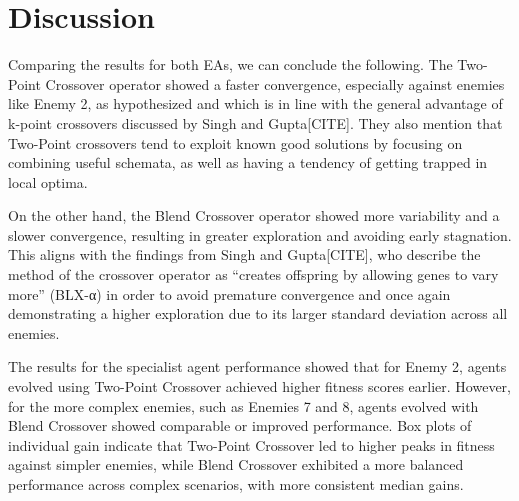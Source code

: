 \section{Discussion}
Comparing the results for both EAs, we can conclude the following.
The Two-Point Crossover operator showed a faster convergence, especially against enemies like Enemy 2, as hypothesized and which is in line with the general advantage of k-point crossovers discussed by Singh and Gupta[CITE].
They also mention that Two-Point crossovers tend to exploit known good solutions by focusing on combining useful schemata, as well as having a tendency of getting trapped in local optima.

On the other hand, the Blend Crossover operator showed more variability and a slower convergence, resulting in greater exploration and avoiding early stagnation.
This aligns with the findings from Singh and Gupta[CITE], who describe the method of the crossover operator as “creates offspring by allowing genes to vary more” (BLX-α) in order to avoid premature convergence and once again demonstrating a higher exploration due to its larger standard deviation across all enemies.

The results for the specialist agent performance showed that for Enemy 2, agents evolved using Two-Point Crossover achieved higher fitness scores earlier.
However, for the more complex enemies, such as Enemies 7 and 8, agents evolved with Blend Crossover showed comparable or improved performance.
Box plots of individual gain indicate that Two-Point Crossover led to higher peaks in fitness against simpler enemies, while Blend Crossover exhibited a more balanced performance across complex scenarios, with more consistent median gains.



